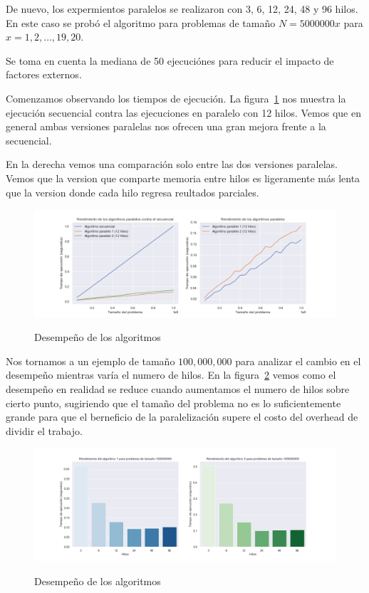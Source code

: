 \documentclass{report}
\begin{document}
De nuevo, los expermientos paralelos se realizaron con 3, 6, 12, 24, 48 y 96 hilos.
En este caso se prob\'o el algoritmo para problemas de tamaño $N = 5000000x$ para
$x = 1, 2, \ldots, 19, 20$.

Se toma en cuenta la mediana de 50 ejecuciónes para reducir el impacto de factores
externos.

Comenzamos observando los tiempos de ejecución. La figura~\ref{fig:squareperf} nos
muestra la ejecución secuencial contra las ejecuciones en paralelo con 12 hilos.
Vemos que en general ambas versiones paralelas nos ofrecen una gran mejora frente
a la secuencial.

En la derecha vemos una comparación solo entre las dos versiones paralelas. Vemos
que la version que comparte memoria entre hilos es ligeramente más lenta que la
version donde cada hilo regresa reultados parciales.

\begin{figure}[H]
    \centering
  \caption{Desempeño de los algoritmos}
\includegraphics[width=\textwidth]{square-perf}
\label{fig:squareperf}
\end{figure}

Nos tornamos a un ejemplo de tamaño $100,000,000$ para analizar el cambio en el
desempeño mientras varía el numero de hilos. En la figura~\ref{fig:squareperfbar}
vemos como el desempeño en realidad se reduce cuando aumentamos el numero de hilos
sobre cierto punto, sugiriendo que el tamaño del problema no es lo suficientemente
grande para que el berneficio de la paralelización supere el costo del overhead de
dividir el trabajo.

\begin{figure}[H]
    \centering
  \caption{Desempeño de los algoritmos}
\includegraphics[width=\textwidth]{square-perf-bar}
\label{fig:squareperfbar}
\end{figure}
\end{document}
